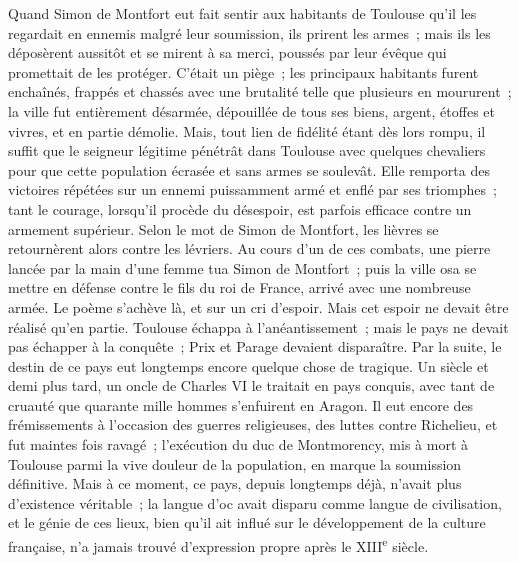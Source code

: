 \documentclass[french,twoside]{book} %
\begin{document}
Quand Simon de Montfort eut fait sentir aux habitants de Toulouse qu'il les regardait en ennemis malgré leur soumission, ils prirent les armes ; mais ils les déposèrent aussitôt et se mirent à sa merci, poussés par leur évêque qui promettait de les protéger. C'était un piège ; les principaux habitants furent enchaînés, frappés et chassés avec une brutalité telle que plusieurs en moururent ; la ville fut entièrement désarmée, dépouillée de tous ses biens, argent, étoffes et vivres, et en partie démolie. Mais, tout lien de fidélité étant dès lors rompu, il suffit que le seigneur légitime pénétrât dans Toulouse avec quelques chevaliers pour que cette population écrasée et sans armes se soulevât. Elle remporta des victoires répétées sur un ennemi puissamment armé et enflé par ses triomphes ; tant le courage, lorsqu'il procède du déses­poir, est parfois efficace contre un armement supérieur. Selon le mot de Simon de Montfort, les lièvres se retournèrent alors contre les lévriers. Au cours d'un de ces combats, une pierre lancée par la main d'une femme tua Simon de Montfort ; puis la ville osa se mettre en défense contre le fils du roi de France, arrivé avec une nombreuse armée. Le poème s'achève là, et sur un cri d'espoir. Mais cet espoir ne devait être réalisé qu'en partie. Toulouse échappa à l'anéantissement ; mais le pays ne devait pas échapper à la conquête ; Prix et Parage devaient disparaître. Par la suite, le destin de ce pays eut longtemps encore quelque chose de tragique. Un siècle et demi plus tard, un oncle de Charles VI le traitait en pays conquis, avec tant de cruauté que quarante mille hommes s'enfuirent en Aragon. Il eut encore des frémissements à l'occasion des guerres religieuses, des luttes contre Richelieu, et fut maintes fois ravagé ; l'exécution du duc de Montmorency, mis à mort à Toulouse parmi la vive douleur de la population, en marque la soumission définitive. Mais à ce moment, ce pays, depuis longtemps déjà, n'avait plus d'existence véritable ; la langue d'oc avait disparu comme langue de civilisation, et le génie de ces lieux, bien qu'il ait influé sur le développement de la culture française, n'a jamais trouvé d'expression propre après le XIII\textsuperscript{e} siècle.\par
\end{document}
